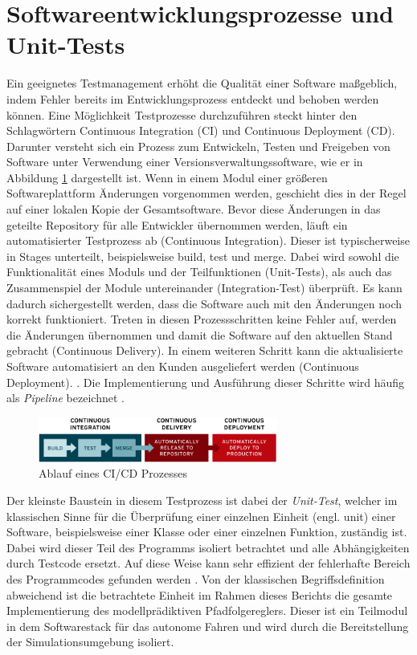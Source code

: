 \section{Softwareentwicklungsprozesse und Unit-Tests} \label{sec:CICD}
Ein geeignetes Testmanagement erhöht die Qualität einer Software maßgeblich, indem Fehler bereits im Entwicklungsprozess entdeckt und behoben werden können. Eine Möglichkeit Testprozesse durchzuführen steckt hinter den Schlagwörtern Continuous Integration (CI) und Continuous Deployment (CD). Darunter versteht sich ein Prozess zum Entwickeln, Testen und Freigeben von Software unter Verwendung einer Versionsverwaltungssoftware, wie er in Abbildung \ref{fig:ci-cd-flow-desktop} dargestellt ist. Wenn in einem Modul einer größeren Softwareplattform Änderungen vorgenommen werden, geschieht dies in der Regel auf einer lokalen Kopie der Gesamtsoftware. Bevor diese Änderungen in das geteilte Repository für alle Entwickler übernommen werden, läuft ein automatisierter Testprozess ab (Continuous Integration). Dieser ist typischerweise in Stages unterteilt, beispielsweise build, test und merge. Dabei wird sowohl die Funktionalität eines Moduls und der Teilfunktionen (Unit-Tests), als auch das Zusammenspiel der Module untereinander (Integration-Test) überprüft. Es kann dadurch sichergestellt werden, dass die Software auch mit den Änderungen noch korrekt funktioniert. Treten in diesen Prozessschritten keine Fehler auf, werden die Änderungen übernommen und damit die Software auf den aktuellen Stand gebracht (Continuous Delivery). In einem weiteren Schritt kann die aktualisierte Software automatisiert an den Kunden ausgeliefert werden (Continuous Deployment). \cite{redhat2024}. Die Implementierung und Ausführung dieser Schritte wird häufig als \textit{Pipeline} bezeichnet \cite{Merode2023}.
\begin{figure}[H]
    \centering
    \includegraphics[width=0.7\textwidth]{figures/2_Grundlagen/ci-cd-flow-desktop.png}
    \caption{Ablauf eines CI/CD Prozesses \cite{redhat2024}}
    \label{fig:ci-cd-flow-desktop}
\end{figure}
Der kleinste Baustein in diesem Testprozess ist dabei der \textit{Unit-Test}, welcher im klassischen Sinne für die Überprüfung einer einzelnen Einheit (engl. unit) einer Software, beispielsweise einer Klasse oder einer einzelnen Funktion, zuständig ist. Dabei wird dieser Teil des Programms isoliert betrachtet und alle Abhängigkeiten durch Testcode ersetzt. Auf diese Weise kann sehr effizient der fehlerhafte Bereich des Programmcodes gefunden werden \cite{Khorikov2020}. Von der klassischen Begriffsdefinition abweichend ist die betrachtete Einheit im Rahmen dieses Berichts die gesamte Implementierung des modellprädiktiven Pfadfolgereglers. Dieser ist ein Teilmodul in dem Softwarestack für das autonome Fahren und wird durch die Bereitstellung der Simulationsumgebung isoliert. 